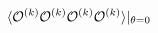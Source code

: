 \begin{equation}\label{1}
  \langle {\cal O}^{(k)}{\cal O}^{(k)}{\cal O}^{(k)}{\cal O}^{(k)} \rangle|_{\theta=0}
\end{equation}

